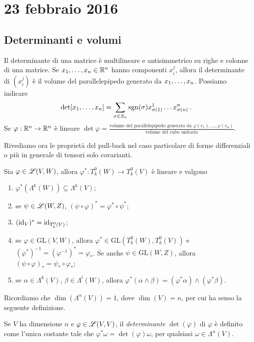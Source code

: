 \chapter{23 febbraio 2016}






\section{Determinanti e volumi}

Il determinante di una matrice è multilineare e antisimmetrico su righe e colonne di una matrice.
Se $\seqb xn, \in\R^n$ hanno componenti $x_i^j$, allora il determinante di $(x_i^j)$ è il volume del parallelepipedo generato da $\seqb xn,$.
Possiamo indicare
\begin{equation*}
	\det[\seqb xn,] = \sum_{\sigma\in S_n} \sgn(\sigma) x_{\sigma(1)}^1\ldots x_{\sigma(n)}^n \punto
\end{equation*}
Se $\varphi:\R^n\to\R^n$ è lineare $\det\varphi = \frac{\text{volume del parallelepipedo generato da $\varphi(e_1),\ldots,\varphi(e_n)$}}{\text{volume del cubo unitario}}$.

Rivediamo ora le proprietà del pull-back nel caso particolare di forme differenziali o più in generale di tensori solo covarianti.
\begin{proposition} \label{prop:PullBackForme}
	Sia $\varphi\in\Lin(V,W)$, allora $\varphi^* : T^0_k(W) \to T^0_k(V)$ è lineare e valgono 
	\begin{enumerate}
		\item $\varphi^*(\Lambda^k(W)) \subseteq \Lambda^k(V)$;
		\item se $\psi\in\Lin(W,Z)$, $(\psi\circ\varphi)^* = \varphi^* \circ \psi^*$; \label{pbf:Composizione}
		\item $(\id_V)^* = \id_{T^0_k(V)}$;
		\item se $\varphi\in \mathrm{GL}(V,W)$, allora $\varphi^*\in \mathrm{GL}(T^0_k(W), T^0_k(V))$ e $(\varphi^*)^{-1} = (\varphi^{-1})^* = \varphi_*$. %
		Se anche $\psi\in\mathrm{GL}(W,Z)$, allora $(\psi\circ\varphi)_* = \psi_*\circ \varphi_*$;
		\item se $\alpha\in\Lambda^k(V)$, $\beta\in\Lambda^l(W)$, allora $\varphi^*(\alpha\wedge\beta) = (\varphi^*\alpha) \wedge (\varphi^*\beta)$.
	\end{enumerate}
\end{proposition}

Ricordiamo che $\dim(\Lambda^n(V)) = 1$, dove $\dim(V)=n$, per cui ha senso la seguente definizione.
\begin{definition} 
	Se $V$ ha dimensione $n$ e $\varphi\in\Lin(V,V)$, il \emph{determinante} $\det(\varphi)$ di $\varphi$ è definito come l'unica costante tale che $\varphi^*\omega = \det(\varphi) \omega$, per qualsiasi $\omega\in\Lambda^n(V)$.
\end{definition}

